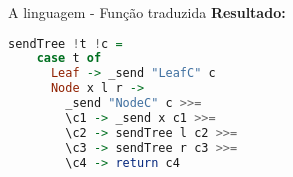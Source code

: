\begin{frame}[fragile]{A linguagem - Função traduzida}
  \textbf{Resultado:}
  \vskip 0.5cm
  \begin{lstlisting}[language=Haskell]
  sendTree !t !c =
    case t of 
      Leaf -> _send "LeafC" c 
      Node x l r ->
        _send "NodeC" c >>=
        \c1 -> _send x c1 >>=
        \c2 -> sendTree l c2 >>=
        \c3 -> sendTree r c3 >>=
        \c4 -> return c4 
   \end{lstlisting}
\end{frame}



